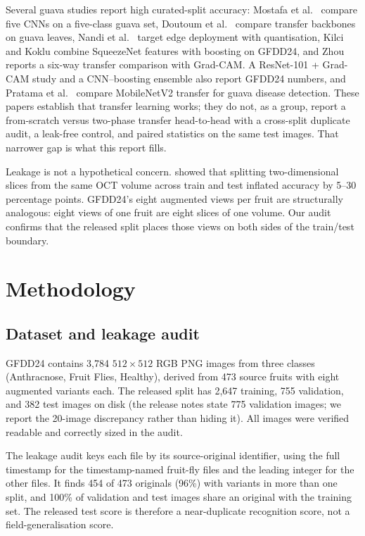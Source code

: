 \documentclass[11pt,a4paper]{article}
\begin{document}
Several guava studies report high curated-split accuracy: Mostafa et al.\
\citep{mostafa2021guava} compare five CNNs on a five-class guava set,
Doutoum et al.\ \citep{doutoum2023guava} compare transfer backbones on guava
leaves, Nandi et al.\ \citep{nandi2022device} target edge deployment with
quantisation, Kilci and Koklu \citep{kilci2024squeezenet} combine SqueezeNet
features with boosting on GFDD24, and Zhou \citep{zhou2026guava} reports a
six-way transfer comparison with Grad-CAM. A ResNet-101 + Grad-CAM study
\citep{resnet101guava2025} and a CNN--boosting ensemble
\citep{cnnGBensemble2025} also report GFDD24 numbers, and Pratama et al.\
\citep{pratama2025jessi} compare MobileNetV2 transfer for guava disease
detection. These papers establish that transfer learning works; they do not,
as a group, report a from-scratch versus two-phase transfer head-to-head with
a cross-split duplicate audit, a leak-free control, and paired statistics on
the same test images. That narrower gap is what this report fills.

Leakage is not a hypothetical concern. \citet{tampu2022leakage} showed that
splitting two-dimensional slices from the same OCT volume across train and
test inflated accuracy by 5--30 percentage points. GFDD24's eight augmented
views per fruit are structurally analogous: eight views of one fruit are eight
slices of one volume. Our audit confirms that the released split places those
views on both sides of the train/test boundary.

\section{Methodology}
\subsection{Dataset and leakage audit}
GFDD24 contains 3,784 $512\times512$ RGB PNG images from three classes
(Anthracnose, Fruit Flies, Healthy), derived from 473 source fruits with eight
augmented variants each. The released split has 2,647 training, 755 validation,
and 382 test images on disk (the release notes state 775 validation images; we
report the 20-image discrepancy rather than hiding it). All images were
verified readable and correctly sized in the audit.

The leakage audit keys each file by its source-original identifier, using the
full timestamp for the timestamp-named fruit-fly files and the leading integer
for the other files. It finds 454 of 473 originals (96\%) with variants in more
than one split, and 100\% of validation and test images share an original with
the training set. The released test score is therefore a near-duplicate
recognition score, not a field-generalisation score.
\end{document}
